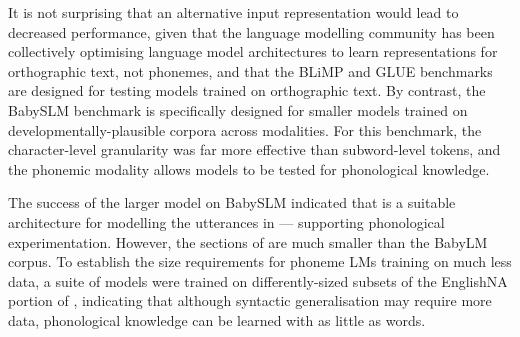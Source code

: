 It is not surprising that an alternative input representation would lead to decreased performance, given that the language modelling community has been collectively optimising language model architectures to learn representations for orthographic text, not phonemes, and that the BLiMP and GLUE benchmarks are designed for testing models trained on orthographic text. By contrast, the BabySLM benchmark is specifically designed for smaller models trained on developmentally-plausible corpora across modalities. For this benchmark, the character-level granularity was far more effective than subword-level tokens, and the phonemic modality allows models to be tested for phonological knowledge.

The success of the larger \gpt model on BabySLM indicated that \gpt is a suitable architecture for modelling the utterances in \ipachildes --- supporting phonological experimentation. However, the sections of \ipachildes are much smaller than the BabyLM corpus. To establish the size requirements for phoneme LMs training on much less data, a suite of models were trained on differently-sized subsets of the EnglishNA portion of \ipachildes, indicating that although syntactic generalisation may require more data, phonological knowledge can be learned with as little as  words. 




